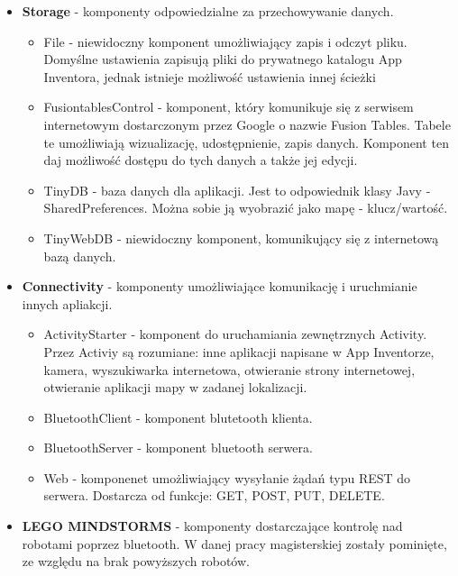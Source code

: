 \begin{itemize}
\item \textbf{Storage} - komponenty odpowiedzialne za przechowywanie danych.
\begin{itemize}
\item File - niewidoczny komponent umożliwiający zapis i odczyt pliku. Domyślne ustawienia zapisują pliki do prywatnego katalogu App Inventora, jednak istnieje możliwość ustawienia innej ścieżki
\item FusiontablesControl - komponent, który komunikuje się z serwisem internetowym dostarczonym przez Google o nazwie Fusion Tables. Tabele te umożliwiają wizualizację, udostępnienie, zapis danych. Komponent ten daj możliwość dostępu do tych danych a także jej edycji.
\item TinyDB - baza danych dla aplikacji. Jest to odpowiednik klasy Javy - SharedPreferences. Można sobie ją wyobrazić jako mapę - klucz/wartość.
\item TinyWebDB - niewidoczny komponent, komunikujący się z internetową bazą danych.
\end{itemize}

\item \textbf{Connectivity} - komponenty umożliwiające komunikację i uruchmianie innych apliakcji.
\begin{itemize}
\item ActivityStarter - komponent do uruchamiania zewnętrznych Activity. Przez Activiy są rozumiane: inne aplikacji napisane w App Inventorze, kamera, wyszukiwarka internetowa, otwieranie strony internetowej, otwieranie aplikacji mapy w zadanej lokalizacji.
\item BluetoothClient - komponent blutetooth klienta.
\item BluetoothServer - komponent bluetooth serwera.
\item Web - komponenet umożliwiający wysyłanie żądań typu REST do serwera. Dostarcza od funkcje: GET, POST, PUT, DELETE.
\end{itemize}

\item \textbf{LEGO MINDSTORMS} - komponenty dostarczające kontrolę nad robotami poprzez bluetooth. W danej pracy magisterskiej zostały pominięte, ze względu na brak powyższych robotów.
\end{itemize}






